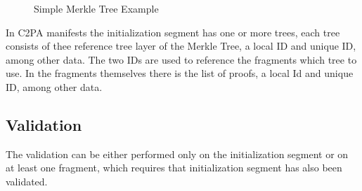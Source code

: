 \begin{figure}
    \centering
    \caption{Simple Merkle Tree Example}
    \label{fig:merkle_example}
\end{figure}

In C2PA manifests the initialization segment has one or more trees, each tree consists of thee reference tree layer of the Merkle Tree, a local ID and unique ID, among other data. The two IDs are used to reference the fragments which tree to use. In the fragments themselves there is the list of proofs, a local Id and unique ID, among other data.

\subsection{Validation}

The validation can be either performed only on the initialization segment or on at least one fragment, which requires that initialization segment has also been validated.

